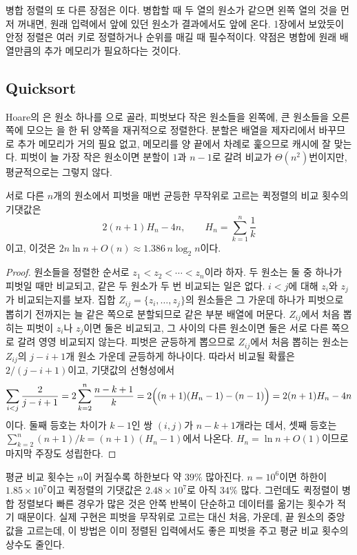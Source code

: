 병합 정렬의 또 다른 장점은 이다. 병합할 때 두 열의 원소가 같으면 왼쪽 열의 것을 먼저 꺼내면, 원래 입력에서 앞에 있던 원소가 결과에서도 앞에 온다. 1장에서 보았듯이 안정 정렬은 여러 키로 정렬하거나 순위를 매길 때 필수적이다. 약점은 병합에 원래 배열만큼의 추가 메모리가 필요하다는 것이다.

\subsection{Quicksort}

Hoare의 은 원소 하나를 으로 골라, 피벗보다 작은 원소들을 왼쪽에, 큰 원소들을 오른쪽에 모으는 을 한 뒤 양쪽을 재귀적으로 정렬한다\cite{hoare1962}. 분할은 배열을 제자리에서 바꾸므로 추가 메모리가 거의 필요 없고, 메모리를 양 끝에서 차례로 훑으므로 캐시에 잘 맞는다. 피벗이 늘 가장 작은 원소이면 분할이 $1$과 $n-1$로 갈려 비교가 $\Theta(n^2)$번이지만, 평균적으로는 그렇지 않다.

\begin{theorem}
\label{thm:quicksort-average}
서로 다른 $n$개의 원소에서 피벗을 매번 균등한 무작위로 고르는 퀵정렬의 비교 횟수의 기댓값은
\[
2(n+1)H_n-4n,\qquad H_n=\sum_{k=1}^n\frac1k
\]
이고, 이것은 $2n\ln n+O(n)\approx1.386\,n\log_2n$이다.
\end{theorem}

\begin{proof}
원소들을 정렬한 순서로 $z_1<z_2<\cdots<z_n$이라 하자. 두 원소는 둘 중 하나가 피벗일 때만 비교되고, 같은 두 원소가 두 번 비교되는 일은 없다. $i<j$에 대해 $z_i$와 $z_j$가 비교되는지를 보자. 집합 $Z_{ij}=\{z_i,\dots,z_j\}$의 원소들은 그 가운데 하나가 피벗으로 뽑히기 전까지는 늘 같은 쪽으로 분할되므로 같은 부분 배열에 머문다. $Z_{ij}$에서 처음 뽑히는 피벗이 $z_i$나 $z_j$이면 둘은 비교되고, 그 사이의 다른 원소이면 둘은 서로 다른 쪽으로 갈려 영영 비교되지 않는다. 피벗은 균등하게 뽑으므로 $Z_{ij}$에서 처음 뽑히는 원소는 $Z_{ij}$의 $j-i+1$개 원소 가운데 균등하게 하나이다. 따라서 비교될 확률은 $2/(j-i+1)$이고, 기댓값의 선형성에서
\[
\sum_{i<j}\frac2{j-i+1}=2\sum_{k=2}^n\frac{n-k+1}k=2\Bigl((n+1)(H_n-1)-(n-1)\Bigr)=2(n+1)H_n-4n
\]
이다. 둘째 등호는 차이가 $k-1$인 쌍 $(i,j)$가 $n-k+1$개라는 데서, 셋째 등호는 $\sum_{k=2}^n(n+1)/k=(n+1)(H_n-1)$에서 나온다. $H_n=\ln n+O(1)$이므로 마지막 주장도 성립한다.
\end{proof}

평균 비교 횟수는 $n$이 커질수록 하한보다 약 $39\%$ 많아진다. $n=10^6$이면 하한이 $1.85\times10^7$이고 퀵정렬의 기댓값은 $2.48\times10^7$로 아직 $34\%$ 많다. 그런데도 퀵정렬이 병합 정렬보다 빠른 경우가 많은 것은 안쪽 반복이 단순하고 데이터를 옮기는 횟수가 적기 때문이다. 실제 구현은 피벗을 무작위로 고르는 대신 처음, 가운데, 끝 원소의 중앙값을 고르는데, 이 방법은 이미 정렬된 입력에서도 좋은 피벗을 주고 평균 비교 횟수의 상수도 줄인다\cite{sedgewick1977quicksort}.

